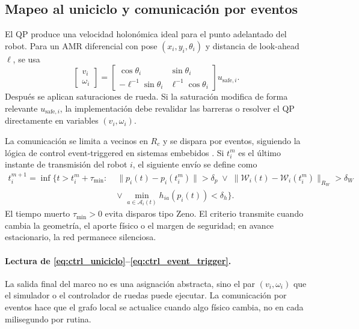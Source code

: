 \subsection{Mapeo al uniciclo y comunicación por eventos}
\label{subsec:control-uniciclo-eventos}

El QP produce una velocidad holonómica ideal para el punto adelantado del robot. Para un
AMR diferencial con pose $(x_i,y_i,\theta_i)$ y distancia de look-ahead $\ell$, se usa
\begin{equation}
  \begin{bmatrix}
    v_i\\
    \omega_i
  \end{bmatrix}
  =
  \begin{bmatrix}
    \cos\theta_i & \sin\theta_i\\
    -\ell^{-1}\sin\theta_i & \ell^{-1}\cos\theta_i
  \end{bmatrix}
  u_{\mathrm{safe},i}.
  \label{eq:ctrl_uniciclo}
\end{equation}
Después se aplican saturaciones de rueda. Si la saturación modifica de forma relevante
$u_{\mathrm{safe},i}$, la implementación debe revalidar las barreras o resolver el QP
directamente en variables $(v_i,\omega_i)$.

La comunicación se limita a vecinos en $R_c$ y se dispara por eventos, siguiendo la
lógica de control event-triggered en sistemas embebidos \citep{tabuada2007event}. Si
$t_i^m$ es el último instante de transmisión del robot $i$, el siguiente envío se define como
\begin{equation}
\begin{aligned}
  t_i^{m+1}
  =
  \inf\{t>t_i^m+\tau_{\min}:\;&
  \|p_i(t)-p_i(t_i^m)\|>\delta_p
  \;\vee\;
  \|\mathcal W_i(t)-\mathcal W_i(t_i^m)\|_{R_W}>\delta_W\\
  &\vee\;
  \min_{a\in\mathcal A_i(t)} h_{ia}(p_i(t))<\delta_h
  \}.
\end{aligned}
\label{eq:ctrl_event_trigger}
\end{equation}
El tiempo muerto $\tau_{\min}>0$ evita disparos tipo Zeno. El criterio transmite cuando
cambia la geometría, el aporte físico o el margen de seguridad; en avance estacionario,
la red permanece silenciosa.

\paragraph{Lectura de \eqref{eq:ctrl_uniciclo}--\eqref{eq:ctrl_event_trigger}.}
La salida final del marco no es una asignación abstracta, sino el par $(v_i,\omega_i)$
que el simulador o el controlador de ruedas puede ejecutar. La comunicación por eventos
hace que el grafo local se actualice cuando algo físico cambia, no en cada milisegundo
por rutina.

